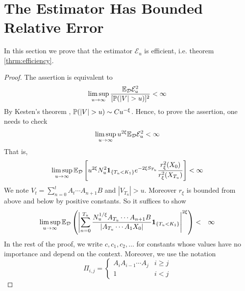 \section{The Estimator Has Bounded Relative
  Error}\label{sec:efficiency}
In this section we prove that the estimator $\mathcal E_u$ is
efficient, i.e. theorem \ref{thrm:efficiency}.
\begin{proof}\setcounter{case}{0}
  The assertion is equivalent to
  \[
  \limsup_{u \to \infty} {\E_{\mathcal D} \mathcal E_u^2 \over [\P(|V|
    > u)]^2} < \infty
  \]
  By Kesten's theorem \cite{kesten:1973},
  $\P(|V| > u) \sim C u^{-\xi}$.
  Hence, to prove the assertion, one needs to check
  \[
  \limsup_{u \to \infty} u^{2\xi}\E_{\mathcal D} \mathcal E_u^2
  <
  \infty
  \]
That is,
  \[
  \limsup_{u \to \infty} \E_{\mathcal D}
  \left[
    u^{2\xi}
    N_u^2 \1{T_u < K_1} e^{-2\xi S_{T_u}} {r_\xi^2(X_0)
      \over r_\xi^2(X_{T_u})}
  \right] < \infty
  \]
  We note $V_t = \sum_{n=0}^t A_{t} \cdots A_{n+1} B$ and
  $|V_{T_u}| > u$. Moreover $r_\xi$ is bounded
  from above and below by positive constants. So it suffices to show
  \begin{eqnarray}
    \limsup_{u \to \infty} \E_{\mathcal D} \left(
      \left|
        \sum_{n=0}^{T_u}
        \frac{
          N_u^{1/\xi} A_{T_u} \cdots A_{n+1} B 
        }{
          |A_{T_u} \cdots A_1 X_0|
        }
        \1{T_u < K_1}
      \right|^{2 \xi}
    \right) &<& \infty \label{eq:efficiency_target}
  \end{eqnarray}
  In the rest of the proof, we write $c, c_1, c_2, \dots$ for
  constants whose values have no importance and depend on the
  context. Moreover, we use the notation
  \[
  \Pi_{i,j} = \left\{
    \begin{array}{ll}
      A_i A_{i-1} \cdots A_j & i \geq j \\
      1 & i < j
    \end{array}
  \right.
  \]


\end{proof}
